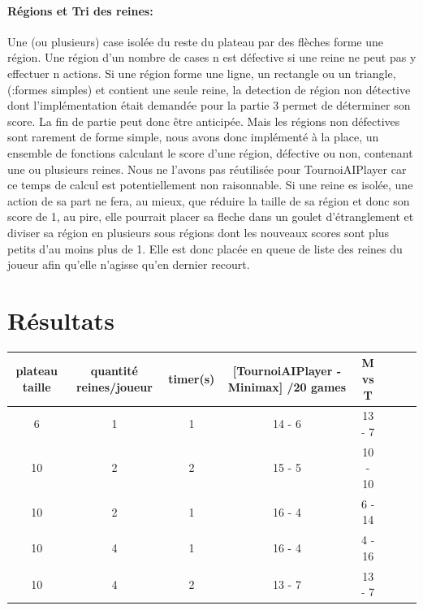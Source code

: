 \documentclass[utf8]{article}
\begin{document}
\paragraph{Régions et Tri des reines:}
     Une (ou plusieurs) case isolée du reste du plateau par des flèches forme une région.
    Une région d'un nombre de cases n est défective si une reine ne peut pas y effectuer n actions.
    Si une région forme une ligne, un rectangle ou un triangle, (:formes simples) et contient une seule reine, la detection de région non détective dont l'implémentation était demandée pour la partie 3 permet de déterminer son score. La fin de partie peut donc être anticipée.
    Mais les régions non défectives sont rarement de forme simple, nous avons donc implémenté à la place, un ensemble de fonctions calculant le score d'une région, défective ou non, contenant une ou plusieurs reines.
    Nous ne l'avons pas réutilisée pour TournoiAIPlayer car ce temps de calcul est potentiellement non raisonnable.
    Si une reine es isolée, une action de sa part ne fera, au mieux, que réduire la taille de sa région et donc son score de 1, au pire, elle pourrait placer sa fleche dans un goulet d'étranglement et diviser sa région en plusieurs sous régions dont les nouveaux scores sont plus petits d'au moins plus de 1. Elle est donc placée en queue de liste des reines du joueur afin qu'elle n'agisse qu'en dernier recourt.

\begin{figure}[H]
\begin{minipage}{\textwidth}
  \centering
	
  \label{fig:m}
\end{minipage}
\end{figure}

\section{Résultats}
\begin{center}
\begin{tabular}{|c|c|c|c|
                |c|c|c|c|}
\hline
plateau taille & quantité reines/joueur & timer(s) & [TournoiAIPlayer - Minimax] /20 games & M vs T \\
\hline
6              & 1                    & 1              & 14 - 6                & 13 - 7 \\
10             & 2                    & 2              & 15 - 5                & 10 - 10    \\
10             & 2                    & 1              & 16 - 4                & 6 - 14    \\
10             & 4                    & 1              & 16 - 4                & 4 - 16    \\
\hline
10             & 4                    & 2              & 13 - 7                & 13 - 7    \\
\hline
\end{tabular}
\end{center}
\end{document}
